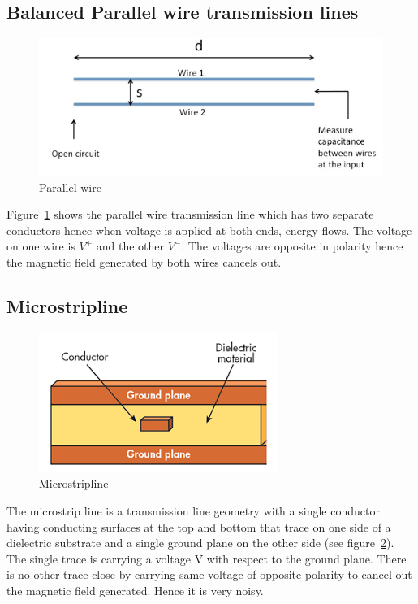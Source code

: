 \subsection{Balanced Parallel wire transmission lines}
\begin{figure}[h]
\centering
\includegraphics[scale=0.4]{./graphics/twowire}
\caption{Parallel wire}
\label{fig:twowire}
\end{figure}

Figure~\ref{fig:twowire} shows the parallel wire transmission line which has two separate conductors hence when voltage is applied at both ends, energy flows. The voltage on one wire is $V^+$ and the other $V^-$. The voltages are opposite in polarity hence the magnetic field generated by both wires cancels out.

\subsection{Microstripline}
\begin{figure}[h]
\centering
\includegraphics[scale=0.7]{./graphics/micro}
\caption{Microstripline}
\label{fig:micro}
\end{figure}

The microstrip line is a transmission line geometry with a single conductor having conducting surfaces at the top and bottom that trace on one side of a dielectric substrate and a single ground plane on the other side (see figure~\ref{fig:micro}). The single trace is carrying a voltage V with respect to the ground plane. There is no other trace close by carrying same voltage of opposite polarity to cancel out the magnetic field generated. Hence it is very noisy.

